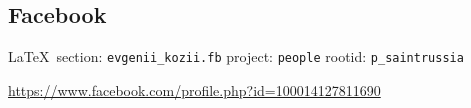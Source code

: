  
 
\subsection{Facebook}

\vspace{0.5cm}
 {\ifDEBUG\small\LaTeX~section: \verb|evgenii_kozii.fb| project: \verb|people| rootid: \verb|p_saintrussia|	\fi}
\vspace{0.5cm}

\url{https://www.facebook.com/profile.php?id=100014127811690}




